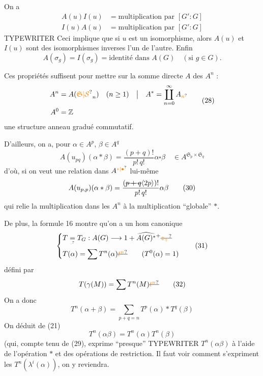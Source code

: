On a
\[
\begin{aligned}
A(u)I(u)&=\text{multiplication par }[G':G]\\
I(u)A(u)&=\text{multiplication par }[G':G]
\end{aligned}\tag*{(26)}
\]
  TYPEWRITER  
Ceci implique que si $u$ est un isomorphisme, alors
$A(u)$ et $I(u)$ sont des isomorphismes inverses l'un
de l'autre. Enfin
\[
A(\sigma_g)=I(\sigma_g)=\text{identité dans } A(G)\quad(\text{si }g\in G). \tag*{(27)}
\]

Ces propriétés suffisent pour mettre sur la somme
directe $A$ des $A^n$ :
\[
\begin{aligned}
A^n&=A(\unsure{\mathfrak S|\mathcal S}_n)\quad(n\geq1)&\big|&& A^*&=\coprod_{n=0}^{\infty}A_{\unsure{n}}\\
A^0&=\mathbb Z
\end{aligned}\tag*{(28)}
\]
une structure  anneau gradué commutatif.

D'ailleurs, on a, pour $\alpha\in A^p$, $\beta\in A^q$
\[
A(u_{pq})(\alpha*\beta)=\frac{(p+q)!}{p!\,q!}\alpha\square\beta
\quad\in A^{\mathfrak S_p\times\mathfrak S_q} \tag*{(29)}
\]
d'où, si on veut une relation dans $A^{\unsure{*|\bullet}}$ lui-même
\[
A(u_{p,p})(\alpha*\beta)=\frac{(\deleted{p+q}\inserted{2p})!}{p!\,q!}\alpha\beta \tag*{(30)}
\]
qui relie la multiplication dans les $A^n$ 
à la multiplication ``globale'' $*$.

De plus, la formule 16 montre qu'on
a un hom canonique
\[
\left\{\begin{aligned}
&T\underset{\unsure{\cdot}}{=}T_G:A(G)\longrightarrow1+\widehat{A(G)^*}{}^+ \deleted{\unsure{z_+}}\\
&T(\alpha)=\sum T^n(\alpha)\deleted{\unsure{t^n}}\qquad(T^0(\alpha)=1)
\end{aligned}\right.\tag*{(31)}
\]
défini par
\[
T(\gamma(M))=\sum T^n(M)\deleted{\unsure{t^n}} \tag*{(32)}
\]
On a donc
\[
T^n(\alpha+\beta)=\sum_{p+q=n}T^p(\alpha)*T^q(\beta) \tag*{(33)}
\]
On déduit de (21)
\[
T^n(\alpha\beta)=T^n(\alpha)T^n(\beta) \tag*{(33)}
\]
(qui, compte tenu de (29), exprime ``presque''
  TYPEWRITER  
$T^n(\alpha\beta)$ à l'aide de l'opération $*$ et des \deleted{\unsure{$\lambda$}} opérations
de restriction. Il faut voir comment s'expriment
les $T^n(\lambda^i(\alpha))$, on y reviendra.

